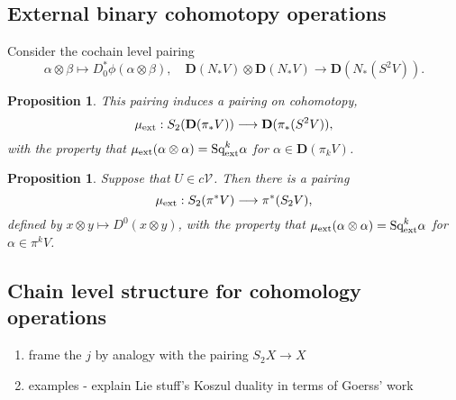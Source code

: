 \documentclass[11pt]{amsart}
\theoremstyle{plain}
\newtheorem{prop}[thm]{Proposition}
\theoremstyle{definition}
\let\oldphi\phi
\let\phi\varphi
\renewcommand{\to}{\longrightarrow}
\newcommand{\calV}{\mathcal{V}}
\theoremstyle{plain}
\newcommand{\vect}[2]{\calV^{#1}_{#2}}
\newcommand{\ExtCohOp}{\textup{Sq}_\textup{ext}}
\newcommand{\ExtCohProd}{\mu_\textup{ext}}
\newcommand{\dual}{\mathbf{D}}
\begin{document}
\begin{Constructing (co)homotopy operations}
\subsection{External binary cohomotopy operations}
Consider the cochain level pairing
\[\alpha\otimes\beta\mapsto D_0^*\oldphi(\alpha\otimes\beta),\quad\dual(N_*V)\otimes \dual(N_*V)\to \dual(N_*(S^2V)).\]
\begin{prop}\label{the external cohomotopy pairing}
This pairing induces a pairing on cohomotopy,
\[\ExtCohProd:S_2(\dual(\pi_*V))\to \dual(\pi_*(S^2V)),\]
with the property that $\ExtCohProd(\alpha\otimes \alpha)=\ExtCohOp^k\alpha$ for $\alpha\in\dual(\pi_kV)$.
\end{prop}
\begin{shaded}
\begin{prop}\label{the external cohomotopy pairing}
Suppose that $U\in c\vect{}{}$. Then there is a pairing
\[\ExtCohProd:S_2(\pi^*V)\to \pi^*(S_2V),\]
defined by $x\otimes y\mapsto D^0(x\otimes y)$,
with the property that $\ExtCohProd(\alpha\otimes \alpha)=\ExtCohOp^k\alpha$ for $\alpha\in \pi^kV$.
\end{prop}
\end{shaded}


\subsection{Chain level structure for cohomology operations}
\hfil
\begin{shaded}
\begin{enumerate}
\item frame the $j$ by analogy with the pairing $S_2X\to X$
\item examples - explain Lie stuff's Koszul duality in terms of Goerss' work
\end{enumerate}
\end{shaded}



\end{Constructing (co)homotopy operations}
\end{document}
